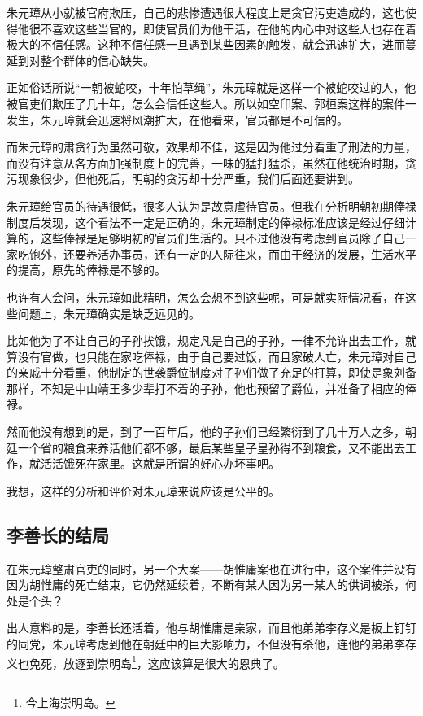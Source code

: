 \begin{multicols}{\theparacolNo}
		朱元璋从小就被官府欺压，自己的悲惨遭遇很大程度上是贪官污吏造成的，这也使得他很不喜欢这些当官的，即使官员们为他干活，在他的内心中对这些人也存在着极大的不信任感。这种不信任感一旦遇到某些因素的触发，就会迅速扩大，进而蔓延到对整个群体的信心缺失。

		正如俗话所说“一朝被蛇咬，十年怕草绳”，朱元璋就是这样一个被蛇咬过的人，他被官吏们欺压了几十年，怎么会信任这些人。所以如空印案、郭桓案这样的案件一发生，朱元璋就会迅速将风潮扩大，在他看来，官员都是不可信的。

		而朱元璋的肃贪行为虽然可敬，效果却不佳，这是因为他过分看重了刑法的力量，而没有注意从各方面加强制度上的完善，一味的猛打猛杀，虽然在他统治时期，贪污现象很少，但他死后，明朝的贪污却十分严重，我们后面还要讲到。

		朱元璋给官员的待遇很低，很多人认为是故意虐待官员。但我在分析明朝初期俸禄制度后发现，这个看法不一定是正确的，朱元璋制定的俸禄标准应该是经过仔细计算的，这些俸禄是足够明初的官员们生活的。只不过他没有考虑到官员除了自己一家吃饱外，还要养活办事员，还有一定的人际往来，而由于经济的发展，生活水平的提高，原先的俸禄是不够的。

		也许有人会问，朱元璋如此精明，怎么会想不到这些呢，可是就实际情况看，在这些问题上，朱元璋确实是缺乏远见的。

		比如他为了不让自己的子孙挨饿，规定凡是自己的子孙，一律不允许出去工作，就算没有官做，也只能在家吃俸禄，由于自己要过饭，而且家破人亡，朱元璋对自己的亲戚十分看重，他制定的世袭爵位制度对子孙们做了充足的打算，即使是象刘备那样，不知是中山靖王多少辈打不着的子孙，他也预留了爵位，并准备了相应的俸禄。

		然而他没有想到的是，到了一百年后，他的子孙们已经繁衍到了几十万人之多，朝廷一个省的粮食来养活他们都不够，最后某些皇子皇孙得不到粮食，又不能出去工作，就活活饿死在家里。这就是所谓的好心办坏事吧。

		我想，这样的分析和评价对朱元璋来说应该是公平的。

		\subsection{李善长的结局}
		在朱元璋整肃官吏的同时，另一个大案——胡惟庸案也在进行中，这个案件并没有因为胡惟庸的死亡结束，它仍然延续着，不断有某人因为另一某人的供词被杀，何处是个头？

		出人意料的是，李善长还活着，他与胡惟庸是亲家，而且他弟弟李存义是板上钉钉的同党，朱元璋考虑到他在朝廷中的巨大影响力，不但没有杀他，连他的弟弟李存义也免死，放逐到崇明岛\footnote{今上海崇明岛。}，这应该算是很大的恩典了。


\end{multicols}
